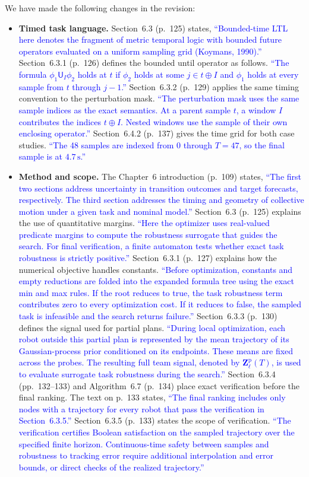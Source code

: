 \documentclass[11pt]{article}
\newcommand{\change}[1]{\textcolor{blue}{#1}}
\begin{document}
We have made the following changes in the revision:
\begin{itemize}
\item \textbf{Timed task language.} Section~6.3 (p.~125) states,
\change{``Bounded-time LTL here denotes the fragment of metric temporal logic with
bounded future operators evaluated on a uniform sampling grid (Koymans, 1990).''}
Section~6.3.1 (p.~126) defines the bounded until operator as follows.
\change{``The formula $\phi_1\mathsf{U}_I\phi_2$ holds at $t$ if $\phi_2$ holds
at some $j\in t\oplus I$ and $\phi_1$ holds at every sample from $t$
through $j-1$.''}
Section~6.3.2 (p.~129) applies the same timing convention to the perturbation mask.
\change{``The perturbation mask uses the same sample indices as the exact semantics.
At a parent sample $t$, a window $I$ contributes the indices $t\oplus I$.
Nested windows use the sample of their own enclosing operator.''}
Section~6.4.2 (p.~137) gives the time grid for both case studies.
\change{``The 48 samples are indexed from $0$ through $T=47$, so the final sample is
at $4.7\,\mathrm{s}$.''}

\item \textbf{Method and scope.} The Chapter~6 introduction (p.~109) states,
\change{``The first two sections address uncertainty in transition outcomes and
target forecasts, respectively. The third section addresses the timing
and geometry of collective motion under a given task and nominal model.''}
Section~6.3 (p.~125) explains the use of quantitative margins.
\change{``Here the optimizer uses real-valued predicate margins to compute the
robustness surrogate that guides the search. For final verification, a finite
automaton tests whether exact task robustness is strictly positive.''}
Section~6.3.1 (p.~127) explains how the numerical objective handles constants.
\change{``Before optimization, constants and empty reductions are folded into the
expanded formula tree using the exact min and max rules. If the root reduces
to true, the task robustness term contributes zero to every optimization cost.
If it reduces to false, the sampled task is infeasible and the search returns
failure.''}
Section~6.3.3 (p.~130) defines the signal used for partial plans.
\change{``During local optimization, each robot outside this partial plan is
represented by the mean trajectory of its Gaussian-process prior
conditioned on its endpoints. These means are fixed across the probes.
The resulting full team signal, denoted by $\mathbf{Z}^{\mathrm{p}}_\ell(T)$,
is used to evaluate surrogate task robustness during the search.''}
Section~6.3.4 (pp.~132--133) and Algorithm~6.7 (p.~134) place exact verification
before the final ranking. The text on p.~133 states,
\change{``The final ranking includes only nodes with a trajectory for every robot
that pass the verification in Section~6.3.5.''}
Section~6.3.5 (p.~133) states the scope of verification.
\change{``The verification certifies Boolean satisfaction on the sampled trajectory
over the specified finite horizon. Continuous-time safety between samples and
robustness to tracking error require additional interpolation and error bounds, or
direct checks of the realized trajectory.''}
\end{itemize}
\end{document}
